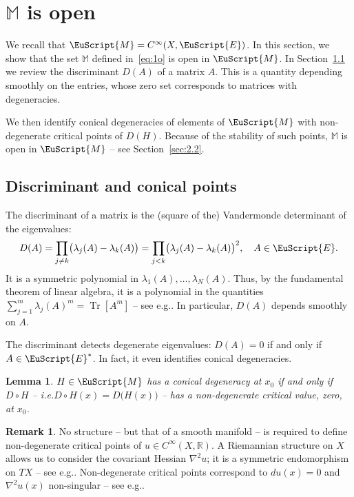 \documentclass[10pt]{amsart}
\let\pazocal\EuScript
\newtheorem{lem}{Lemma}[section]
\theoremstyle{definition}
\newtheorem{rmk}{Remark}[section]
\DeclareMathOperator{\Tr}{Tr}
\newcommand{\EE}{\pazocal{E}}
\newcommand{\MM}{\pazocal{M}}
\newcommand{\R}{\mathbb{R}}
\newcommand{\Mm}{\mathbb{M}}
\providecommand{\eg}{e.g.}\providecommand{\ie}{i.e.}\providecommand{\etc}{etc.}\providecommand{\resp}{resp.}\providecommand{\cf}{cf.}
\begin{document}
\section{\texorpdfstring{$\Mm$}{M} is open}\label{sec:2}

We recall that $\MM = C^\infty(X,\EE)$. In this section, we show that the set $\Mm$ defined in~\eqref{eq:1o} is open in $\MM$. In Section~\ref{sec:2.1} we review the discriminant $D(A)$ of a matrix $A$. This is a quantity depending smoothly on the entries, whose zero set corresponds to matrices with degeneracies.

We then identify conical degeneracies of elements of $\MM$ with non-degenerate critical points of $D(H)$. Because of the stability of such points, $\Mm$ is open in $\MM$ -- see Section~\ref{sec:2.2}.

\subsection{Discriminant and conical points}\label{sec:2.1} The discriminant of a matrix is the (square of the) Vandermonde determinant of the eigenvalues:
\begin{equation}\label{eq:1h}
D(A) = \prod_{j \neq k} \bigl(\lambda_j(A)-\lambda_k(A)\bigr) = \prod_{j < k} \bigl(\lambda_j(A)-\lambda_k(A)\bigr)^2, \quad A\in \EE.
\end{equation}
It is a symmetric polynomial in $\lambda_1(A), \dots, \lambda_N(A)$. Thus, by the fundamental theorem of linear algebra, it is a polynomial in the quantities $\sum_{j=1}^m \lambda_j(A)^m = \Tr[A^m]$ -- see \eg \cite[\S I.2]{M95}. In particular, $D(A)$ depends smoothly on $A$.

The discriminant detects degenerate eigenvalues: $D(A) = 0$ if and only if $A \in \EE^*$. In fact, it even identifies conical degeneracies.

\begin{lem}\label{lem:1a} $H \in \MM$ has a conical degeneracy at $x_0$ if and only if $D \circ H$ -- \ie $D \circ H(x) = D\bigl( H(x) \bigr)$ -- has a non-degenerate critical value, zero, at $x_0$.
\end{lem}

\begin{rmk}\label{rem:2} No structure -- but that of a smooth manifold -- is required to define non-degenerate critical points of $u \in C^\infty(X,\R)$. A Riemannian structure on $X$ allows us to consider the covariant Hessian $\nabla^2 u$; it is a symmetric endomorphism on $TX$ -- see \eg \cite[\S2.1]{P06}. Non-degenerate critical points correspond to $du(x) = 0$ and $\nabla^2u(x)$ non-singular -- see \eg \cite[\S5.12]{P06}.
\end{rmk}
\end{document}
